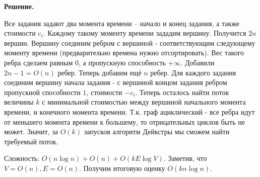 \begin{enumerate}
	\textbf{Решение.}
	
	Все задания задают два момента времени -- начало и конец задания, а также стоимости $c_i$. Каждому такому моменту времени зададим вершину. Получится $2n$ вершин. Вершину соединим ребром с вершиной - соответствующим следующему моменту времени (предварительно времена нужно отсортировать). Вес такого ребра сделаем равным $0$, а пропускную способность $+\infty$. Добавили $2n - 1 = O(n)$ ребер. Теперь добавим ещё $n$ ребер. Для каждого задания соединим вершину начала задания - с вершиной концом задания ребром пропускной способности $1$, стоимости $-c_i$. Теперь осталось найти поток величины $k$ с минимальной стоимостью между вершиной начального момента времени, и конечного момента времени. Т.к. граф ациклический - все ребра идут от меньшего момента времени к большему, то отрицательных циклов быть не может. Значит, за $O(k)$ запусков алгоритм Дейкстры мы сможем найти требуемый поток. 
	
	Сложность: $O(n\log n) + O(n) + O(kE\log V)$. Заметив, что $V = O(n), E = O(n)$. Получим итоговую оценку $O(kn\log n)$.
	
\end{enumerate}

